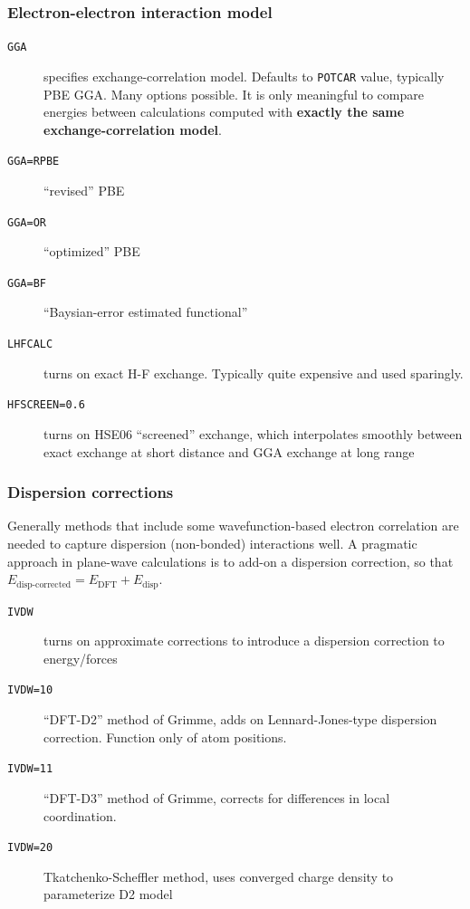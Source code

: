 \documentclass[11pt]{article}
\begin{document}
\subsubsection{Electron-electron interaction model}
\label{sec:org68b13ba}
\begin{description}
\item[{\texttt{GGA}}] specifies exchange-correlation model. Defaults to \texttt{POTCAR} value, typically PBE GGA.   Many options possible. It is only meaningful to compare energies between calculations computed with \textbf{exactly the same exchange-correlation model}.
\item[{\texttt{GGA=RPBE}}] ``revised'' PBE
\item[{\texttt{GGA=OR}}] ``optimized'' PBE
\item[{\texttt{GGA=BF}}] ``Baysian-error estimated functional''
\item[{\texttt{LHFCALC}}] turns on exact H-F exchange.  Typically quite expensive and used sparingly.
\item[{\texttt{HFSCREEN=0.6}}] turns on HSE06 ``screened'' exchange, which interpolates smoothly between exact exchange at short distance and GGA exchange at long range
\end{description}

\subsubsection{Dispersion corrections}
\label{sec:orga71d020}
Generally methods that include some wavefunction-based electron correlation are needed to capture dispersion (non-bonded) interactions well. A pragmatic approach in plane-wave calculations is to add-on a dispersion correction, so that \(E_\text{disp-corrected} = E_\text{DFT} + E_\text{disp}\).
\begin{description}
\item[{\texttt{IVDW}}] turns on approximate corrections to introduce a dispersion correction to energy/forces
\item[{\texttt{IVDW=10}}] ``DFT-D2'' method of Grimme, adds on Lennard-Jones-type dispersion correction. Function only of atom positions.
\item[{\texttt{IVDW=11}}] ``DFT-D3'' method of Grimme, corrects for differences in local coordination.
\item[{\texttt{IVDW=20}}] Tkatchenko-Scheffler method, uses converged charge density to parameterize D2 model
\end{description}
\end{document}
